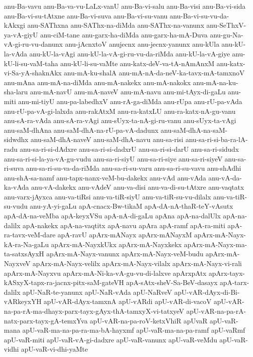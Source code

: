 {anu-Ba-vavu
anu-Ba-va-vu-LaLx-vanU
anu-Ba-vi-salu
anu-Ba-visi
anu-Ba-vi-sida
anu-Ba-vi-su-tAtxne
anu-Ba-vi-suva
anu-Ba-vi-su-vanu
anu-Ba-vi-su-vu-da-kAkxgi
anu-SAThxna
anu-SAThx-na-diMda
anu-SAThx-na-vanunx
anu-SeThxV-ya-vA-giyU
anu-ciM-tane
anu-garx-ha-diMda
anu-garx-ha-mA-Duva
anu-gu-Na-vA-gi-ru-vu-danunx
anu-jAcnxtoV
anujecnx
anu-jecnx-yanunx
anu-kUla
anu-kU-la-vAda
anu-kU-la-vAgi
anu-kU-la-vA-gi-ru-vu-da-riMda
anu-kU-la-vA-giye
anu-kU-li-su-vaM-taha
anu-kU-li-su-vaMte
anu-katx-deV-va-tA-nAmAnxM
anu-katx-vi-Sa-yA-shaknAkx
anu-mA-ku-shalA
anu-mA-nA-da-neV-ka-tavx-mA-tamxnoV
anu-mAna
anu-mA-na-diMda
anu-mA-nakekx
anu-mA-nakokx
anu-mA-na-ku-sha-laru
anu-mA-navU
anu-mA-naveV
anu-mA-navu
anu-mi-tAyx-di-gaLu
anu-miti
anu-mi-tiyU
anu-pa-labedhxV
anu-rA-ga-diMda
anu-rUpa
anu-rU-pa-vAda
anu-rU-pa-vA-gi-lalxda
anu-rakAtxM
anu-ra-katxLU
anu-ra-katx-nA-gu-vanu
anu-sA-ra-vAda
anu-sA-ra-vAgi
anu-sUyx-ta-nA-gi-ru-vanu
anu-sUyx-ta-vAgi
anu-saM-dhAna
anu-saM-dhA-na-rU-pa-vA-dadunx
anu-saM-dhA-na-saM-sidwdhx
anu-saM-dhA-naveV
anu-saM-dhA-navu
anu-sa-risi
anu-sa-ri-si-ba-ra-lA-radu
anu-sa-ri-si-dAdxre
anu-sa-ri-si-dadxrU
anu-sa-ri-si-darU
anu-sa-ri-sidudx
anu-sa-ri-si-la-ya-vA-gu-vudu
anu-sa-ri-siyU
anu-sa-ri-siye
anu-sa-ri-siyeV
anu-sa-ri-suva
anu-sa-ri-su-va-da-riMda
anu-sa-ri-su-varu
anu-sa-ri-su-vavu
anu-shAdhi
anu-shA-sa-namf
anu-tapx-nanx-veM-bu-dakekx
anu-vAd
anu-vAda
anu-vA-da-ka-vAda
anu-vA-dakekx
anu-vAdeV
anu-va-disi
anu-va-di-su-tAtxre
anu-vaqtatx
anu-varx-jAyxca
anu-va-tiRsi
anu-va-tiR-siyU
anu-va-tiR-su-vu-dilalx
anu-va-tiR-su-vudu
anu-yA-yi-gaLu
apA-cnacx-Bw-tikaM
apA-dA-nA-thaR-teY-vAsutx
apA-dA-na-veMba
apA-keyxVSu
apA-nA-di-gaLu
apAna
apA-na-dalUlx
apA-na-dalilx
apA-nakekx
apA-na-vaqtitx
apA-navu
apAra
apA-ramf
apA-ra-miti
apA-ra-tavx-veM-dare
apA-ravU
apArx-mANayx
apArx-mANayxM
apArx-mA-Nayx-kA-ra-Na-gaLu
apArx-mA-NayxkUkx
apArx-mA-Nayxkekx
apArx-mA-Nayx-ma-ta-satxsAyxH
apArx-mA-Nayx-vanunx
apArx-mA-Nayx-veM-budu
apArx-mA-NayxveV
apArx-mA-Nayx-velilx
apArx-mA-Nayx-vilalx
apArx-mA-Nayx-vi-rali
apArx-mA-Nayxvu
apArx-mA-Ni-ka-vA-gu-vu-di-lalxve
apArxpAtx
apArx-tayx-kASxyX-tapx-ra-jacnx-pitx-saM-gateVH
apA-sAtx-sheV-Sa-BeV-dasayx
apA-tarx-dalilx
apU-NaR-te-yanunx
apU-NaR-vAda
apU-NaRveV
apU-vAR-dAyx-di-Bi-vARkeyxYH
apU-vAR-dAyx-tamxnA
apU-vARdi
apU-vAR-di-vacoV
apU-vAR-na-pa-rA-ma-dhayx-parx-tayx-gAyx-thA-tamxyX-vi-tatxyeV
apU-vAR-na-pa-rA-natx-parx-tayx-gA-temxYva
apU-vAR-na-pa-roV-ketxVhiR
apUvaR
apU-vaR-mana
apU-vaR-ma-na-pa-ra-ma-bA-hayxmf
apU-vaR-ma-na-pa-ramf
apU-vaRmf
apU-vaR-miti
apU-vaR-vA-gi-dadxre
apU-vaR-vanunx
apU-vaR-veMdu
apU-vaR-vidhi
apU-vaR-vi-dhi-yaMte
}
